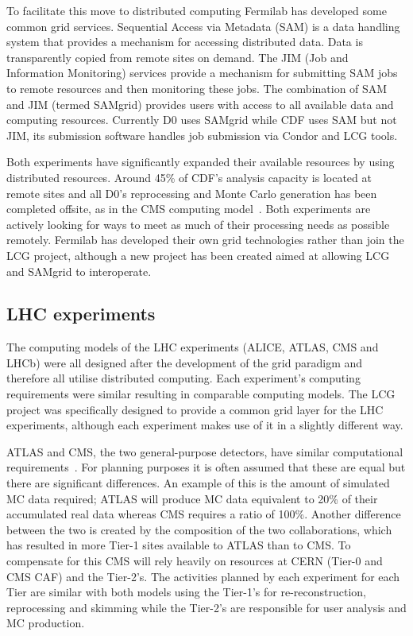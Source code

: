 To facilitate this move to distributed computing Fermilab has developed some common grid services. Sequential Access via Metadata (SAM) is a data handling system that provides a mechanism for accessing distributed data. Data is transparently copied from remote sites on demand. The JIM (Job and Information Monitoring) services provide a mechanism for submitting SAM jobs to remote resources and then monitoring these jobs. The combination of SAM and JIM (termed SAMgrid) provides users with access to all available data and computing resources. Currently D0 uses SAMgrid while CDF uses SAM but not JIM, its submission software handles job submission via Condor and LCG tools.

Both experiments have significantly expanded their available resources by using distributed resources. Around 45\% of CDF's analysis capacity is located at remote sites and all D0's reprocessing and Monte Carlo generation has been completed offsite, as in the CMS computing model~\cite{run2_comp_review}. Both experiments are actively looking for ways to meet as much of their processing needs as possible remotely. Fermilab has developed their own grid technologies rather than join the LCG project, although a new project has been created aimed at allowing LCG and SAMgrid to interoperate.


\subsection{LHC experiments}
The computing models of the LHC experiments (ALICE, ATLAS, CMS and LHCb) were all designed after the development of the grid paradigm and therefore all utilise distributed computing. Each experiment's computing requirements were similar resulting in comparable computing models. The LCG project was specifically designed to provide a common grid layer for the LHC experiments, although each experiment makes use of it in a slightly different way.

ATLAS and CMS, the two general-purpose detectors, have similar computational requirements~\cite{LCG_TDR}. For planning purposes it is often assumed that these are equal but there are significant differences. An example of this is the amount of simulated MC data required; ATLAS will produce MC data equivalent to 20\% of their accumulated real data whereas CMS requires a ratio of 100\%. Another difference between the two is created by the composition of the two collaborations, which has resulted in more Tier-1 sites available to ATLAS than to CMS. To compensate for this CMS will rely heavily on resources at CERN (Tier-0 and CMS CAF) and the Tier-2's. The activities planned by each experiment for each Tier are similar with both models using the Tier-1's for re-reconstruction, reprocessing and skimming while the Tier-2's are responsible for user analysis and MC production.

